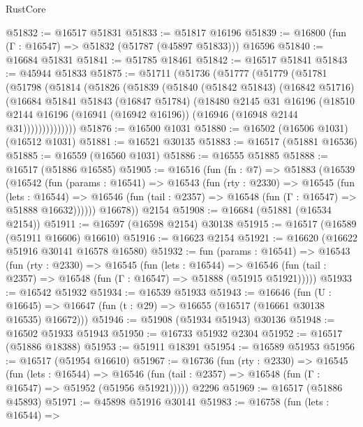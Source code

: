 \begin{lexlean}{RustCore}
\begin{coremodule}
@51832 := @16517 @51831
@51833 := @51817 @16196
@51839 := @16800 (fun (Γ : @16547) => @51832 (@51787 (@45897 @51833))) @16596
@51840 := @16684 @51831
@51841 := @51785 @18461
@51842 := @16517 @51841
@51843 := @45944 @51833
@51875 := @51711
    (@51736
      (@51777
        (@51779
          (@51781
            (@51798
              (@51814
                (@51826
                  (@51839
                    (@51840
                      (@51842 @51843)
                      (@16842 @51716)
                      (@16684
                        @51841
                        @51843
                        (@16847 @51784)
                        (@18480
                          @2145
                          @31
                          @16196
                          (@18510
                            @2144
                            @16196
                            (@16941 (@16942 @16196))
                            (@16946 (@16948 @2144 @31))))))))))))))
@51876 := @16500 @1031
@51880 := @16502 (@16506 @1031) (@16512 @1031)
@51881 := @16521 @30135
@51883 := @16517 (@51881 @16536)
@51885 := @16559 (@16560 @1031)
@51886 := @16555 @51885
@51888 := @16517 (@51886 @16585)
@51905 := @16516
    (fun (fn : @7) =>
    @51883
      (@16539
        (@16542
          (fun (params : @16541) =>
          @16543
            (fun (rty : @2330) =>
            @16545
              (fun (lets : @16544) =>
              @16546 (fun (tail : @2357) => @16548 (fun (Γ : @16547) => @51888 @16632))))))
        @16678))
    @2154
@51908 := @16684 (@51881 (@16534 @2154))
@51911 := @16597 (@16598 @2154) @30138
@51915 := @16517 (@16589 (@51911 @16606) @16610)
@51916 := @16623 @2154
@51921 := @16620 (@16622 @51916 @30141 @16578 @16580)
@51932 := fun (params : @16541) =>
  @16543
    (fun (rty : @2330) =>
    @16545
      (fun (lets : @16544) =>
      @16546 (fun (tail : @2357) => @16548 (fun (Γ : @16547) => @51888 (@51915 @51921)))))
@51933 := @16542 @51932
@51934 := @16539 @51933
@51943 := @16646
    (fun (U : @16645) => @16647 (fun (t : @29) => @16655 (@16517 (@16661 @30138 @16535) @16672)))
@51946 := @51908 (@51934 @51943) @30136
@51948 := @16502 @51933 @51943
@51950 := @16733 @51932 @2304
@51952 := @16517 (@51886 @18388)
@51953 := @51911 @18391
@51954 := @16589 @51953
@51956 := @16517 (@51954 @16610)
@51967 := @16736
    (fun (rty : @2330) =>
    @16545
      (fun (lets : @16544) =>
      @16546 (fun (tail : @2357) => @16548 (fun (Γ : @16547) => @51952 (@51956 @51921)))))
    @2296
@51969 := @16517 (@51886 @45893)
@51971 := @45898 @51916 @30141
@51983 := @16758
    (fun (lets : @16544) =>

\end{coremodule}
\end{lexlean}

